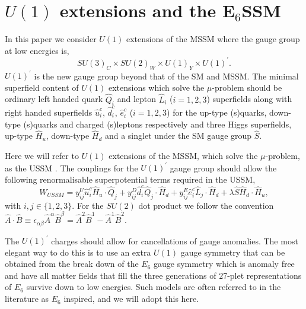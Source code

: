 \documentclass[preprint,amsmath,amssymb,aps,superscriptaddress,prd,showpacs,floatfix,nofootinbib]{revtex4-1}
\newcommand{\be}{\begin{equation}}
\newcommand{\ee}{\end{equation}}
\begin{document}
\section{\label{sec:model}$U(1)$ extensions and the E$_6$SSM}
In this paper we consider $U(1)$ extensions of the MSSM where the gauge
group at low energies is, \be SU(3)_C\times SU(2)_W\times U(1)_Y\times
U(1)^\prime. \ee $U(1)^\prime$ is the new gauge group beyond
that of the SM and MSSM. The minimal superfield content of $U(1)$
extensions which solve the $\mu$-problem should be ordinary left
handed quark $\hat{Q}_i$ and lepton $\hat{L}_i$
($i=1,2,3$) superfields along with right handed superfields
$\hat{u}^c_i$, $\hat{d}^c_i$, $\hat{e}^c_i$ ($i=1,2,3$) for the
up-type (s)quarks, down-type (s)quarks and charged (s)leptons
respectively and three Higgs superfields, up-type $\hat{H}_u$,
down-type $\hat{H}_d$ and a singlet under the SM gauge group
$\hat{S}$.


Here we will refer to $U(1)$ extensions of the MSSM, which solve the
$\mu$-problem, as the USSM \cite{Cvetic:1995rj, Jain:1995cb,
  Nir:1995bu, Cvetic:1996mf, Cvetic:1997ky}.  The couplings for the
$U(1)^\prime$ gauge group should allow the following renormalisable
superpotential terms required in the USSM, \begin{equation}
 W_{USSM} = y^U_{ij}
\hat{u}^c_i  \hat{H}_u \cdot \hat{Q}_j + y^D_{ij} \hat{d}^c_i  \hat{Q}_j \cdot \hat{H}_d
 + y^E_{ij} \hat{e}^c_i \hat{L}_j \cdot \hat{H}_d  + \lambda \hat{S} \hat{H}_d \cdot \hat{H}_u, 
\end{equation} with $i,j \in \{1,2,3\}$. 
For the $SU(2)$ dot product we follow the convention $\hat{A}\cdot \hat{B}\equiv \epsilon_{\alpha\beta}\hat{A}^\alpha\hat{B}^\beta=\hat{A}^2\hat{B}^1-\hat{A}^1\hat{B}^2$.


The $U(1)^\prime$ charges should allow for cancellations of gauge
anomalies.  The most elegant way to do this is to use an extra $U(1)$
gauge symmetry that can be obtained from the break down of the $E_6$
gauge symmetry which is anomaly free and have all matter fields that fill the
three generations of $27$-plet representations of $E_6$ survive down to
low energies.  Such models are often referred to in the literature as
$E_6$ inspired, and we will adopt this here.
\end{document}

